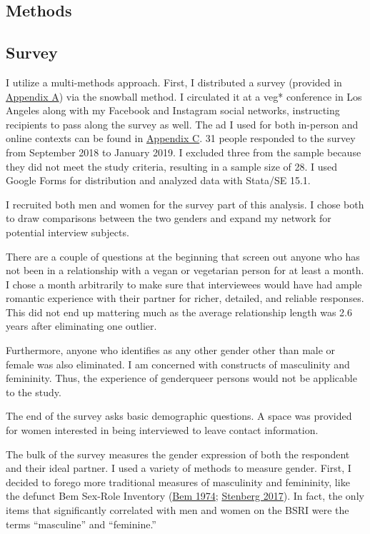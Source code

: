 \documentclass[twoside]{report}
\let\oldsection\section
\renewcommand\section{\clearpage\oldsection}
\begin{document}
\begin{multicols*}{2}
\section{Methods}

\subsection{Survey}

I utilize a multi-methods approach. First, I distributed a survey
(provided in \hyperlink{appendix-a}{Appendix A}) via the snowball method. I circulated it at a
veg* conference in Los Angeles along with my Facebook and Instagram social networks, instructing recipients to pass along the survey as well. The ad I used for both in-person and online contexts can be found in \hyperlink{appendix-c}{Appendix C}. 31 people responded to the survey from September 2018 to January 2019. I excluded
three from the sample because they did not meet the study criteria,
resulting in a sample size of 28. I used Google Forms for distribution
and analyzed data with Stata/SE 15.1.

I recruited both men and women for the survey part of this analysis. I
chose both to draw comparisons between the two genders and expand my
network for potential interview subjects. 

There are a couple of questions at the beginning that screen out anyone who has not been in a relationship with a vegan or vegetarian person for at least a month. I chose a month arbitrarily to make sure that interviewees would have had ample romantic experience with their partner for richer, detailed, and reliable responses. This did not end up mattering much as the average relationship length was 2.6 years after eliminating one outlier. 

Furthermore, anyone who identifies as any other gender other than male or female was also eliminated. I am concerned with constructs of masculinity and femininity. Thus, the experience of genderqueer persons would not be applicable to the study. 

The end of the survey asks basic demographic questions. A space was provided for women interested in being interviewed to leave contact information.

The bulk of the survey measures the gender expression of both the
respondent and their ideal partner. I used a variety of methods to
measure gender. First, I decided to forego more traditional measures of
masculinity and femininity, like the defunct Bem Sex-Role Inventory (\hyperlink{bem}{Bem 1974}; \hyperlink{stenberg}{Stenberg 2017}). In fact, the only items that
significantly correlated with men and women on the BSRI were the terms
``masculine'' and ``feminine.''


\end{multicols*}
\end{document}
